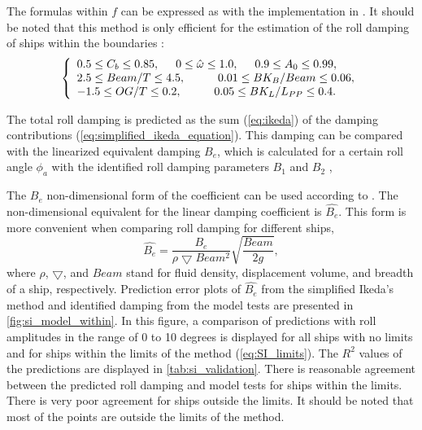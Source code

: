 \noindent The formulas within $f$ can be expressed as \parencite{ikeda_velocity_1979, kawahara_simple_2011} with the implementation in \cite{alexandersson_martinlarsalbertrolldecay-estimators_2020}.
It should be noted that this method is only efficient for the estimation of the roll damping of ships within the boundaries \parencite{kawahara_simple_2011}:
\begin{equation}
    \label{eq:SI_limits}
     \left\{
     \begin{array}{ll}
    0.5 \leq C_b \leq 0.85,\hspace{0.5cm} 
    0 \leq \hat{\omega} \leq 1.0,
    \hspace{0.5cm}
    0.9 \leq A_0 \leq 0.99,\\
    2.5\leq Beam/T \leq 4.5, \hspace{1cm}
    0.01 \leq BK_B/Beam \leq 0.06, \\
        -1.5 \leq OG/T \leq 0.2,
     \hspace{1cm}
    0.05 \leq BK_L/L_{PP} \leq 0.4.
    \end{array}
    \right.
\end{equation}

\noindent The total roll damping is predicted as the sum (\autoref{eq:ikeda}) of the damping contributions (\autoref{eq:simplified_ikeda_equation}). This damping can be compared with the linearized equivalent damping $B_e$, which is calculated for a certain roll angle $\phi_a$ with the identified roll damping parameters $B_1$ and $B_2$ \cite{himeno_prediction_1981},


\noindent The $B_e$ non-dimensional form of the coefficient can be used according to \parencite{himeno_prediction_1981}. The non-dimensional equivalent for the linear damping coefficient is $\hat{B_e}$. This form is more convenient when comparing roll damping for different ships,
\begin{equation} \label{eq:be_eqvalent}
    \hat{B_e} = \frac{B_e}{\rho \bigtriangledown Beam^2} \sqrt{\frac{Beam}{2g}},
\end{equation}
\noindent where $\rho$, $\bigtriangledown$, and $Beam$ stand for fluid density, displacement volume, and breadth of a ship, respectively. Prediction error plots of $\hat{B_e}$ from the simplified Ikeda's method and identified damping from the model tests are presented in \autoref{fig:si_model_within}. In this figure, a comparison of predictions with roll amplitudes in the range of 0 to 10 degrees is displayed for all ships with no limits and for ships within the limits of the method (\autoref{eq:SI_limits}). The $R^2$ values of the predictions are displayed in \autoref{tab:si_validation}. There is reasonable agreement between the predicted roll damping and model tests for ships within the limits. There is very poor agreement for ships outside the limits. It should be noted that most of the points are outside the limits of the method.

